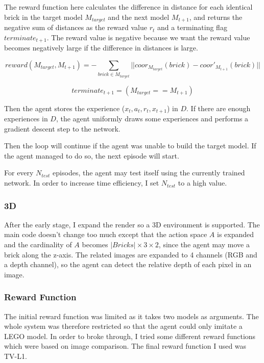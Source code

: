 \documentclass[a4paper]{article}
\begin{document}
		        The reward function here calculates the difference in distance for each identical brick in the target model $M_{target}$ and the next model $M_{t+1}$, and returns the negative sum of distances as the reward value $r_t$ and a terminating flag $terminate_{t+1}$. The reward value is negative because we want the reward value becomes negatively large if the difference in distances is large.
		        
		        \begin{equation*}
			        reward(M_{target}, M_{t+1}) = - \sum_{brick \in M_{target}} ||coor_{M_{target}}(brick) - coor'_{M_{t+1}}(brick)||
		        \end{equation*} 
		        
		        \begin{equation*}
			        terminate_{t+1} = (M_{target} == M_{t+1})
		        \end{equation*}
		        
		        Then the agent stores the experience ($x_t,a_t,r_t,x_{t+1}$) in $D$. If there are enough experiences in $D$, the agent uniformly draws some experiences and performs a gradient descent step to the network. 
		        
		        Then the loop will continue if the agent was unable to build the target model. If the agent managed to do so, the next episode will start. 
		        
		        \vspace{5mm}
		        
		        For every $N_{test}$ episodes, the agent may test itself using the currently trained network. In order to increase time efficiency, I set $N_{test}$ to a high value.
		        
		    \subsubsection{3D}
		    	After the early stage, I expand the render so a 3D environment is supported. The main code doesn't change too much except that the action space $A$ is expanded and the cardinality of $A$ becomes $|Bricks| \times 3 \times 2$, since the agent may move a brick along the z-axis. The related images are expanded to 4 channels (RGB and a depth channel), so the agent can detect the relative depth of each pixel in an image.  
		    	
        	\subsubsection{Reward Function}
        		The initial reward function was limited as it takes two models as arguments. The whole system was therefore restricted so that the agent could only imitate a LEGO model. In order to broke through, I tried some different reward functions which were based on image comparison. The final reward function I used was TV-L1\cite{tvl1}. 
        		
\end{document}
